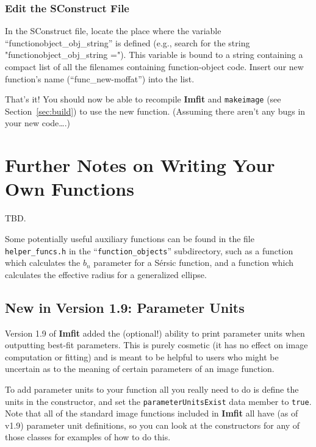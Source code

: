 \documentclass[10pt,a4paper,article]{memoir}
\newcommand{\imfit}{\textbf{Imfit}}
\newcommand{\Imfit}{\textbf{Imfit}}
\newcommand{\makeimage}{\texttt{makeimage}}
\begin{document}
\subsubsection{Edit the SConstruct File}

In the SConstruct file, locate the place where the variable
``functionobject\_obj\_string'' is defined (e.g., search for the string
"functionobject\_obj\_string ="). This variable is bound to a string containing a
compact list of all the filenames containing function-object code. Insert our
new function's name (``func\_new-moffat'') into the list.

\bigskip

That's it! You should now be able to recompile \imfit{} and \makeimage{} 
(see Section~\ref{sec:build}) to use
the new function. (Assuming there aren't any bugs in your new code\ldots.)



\section{Further Notes on Writing Your Own Functions}

TBD.

Some potentially useful auxiliary functions can be found in the file
\texttt{helper\_funcs.h} in the ``\texttt{function\_objects}'' subdirectory,
such as a function which calculates the $b_{n}$ parameter for a S\'ersic
function, and a function which calculates the effective radius for a
generalized ellipse.


\subsection{New in Version 1.9: Parameter Units}

Version 1.9 of \Imfit{} added the (optional!) ability to print parameter units
when outputting best-fit parameters. This is purely cosmetic (it has no effect
on image computation or fitting) and is meant to be helpful to users who
might be uncertain as to the meaning of certain parameters of an image function.

To add parameter units to your function all you really need to do is
define the units in the constructor, and set the
\texttt{parameterUnitsExist} data member to \texttt{true}. Note that all
of the standard image functions included in \Imfit{} all have (as of v1.9)
parameter unit definitions, so you can look at the constructors for any
of those classes for examples of how to do this.
\end{document}
